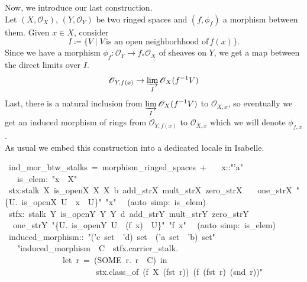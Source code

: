 \documentclass[12pt]{scrartcl}
\begin{document}
Now, we introduce our last construction. \\
	Let $(X, \mathscr{O}_X)$, $(Y, \mathscr{O}_Y)$ be two ringed spaces and $(f, \phi_f)$ a morphism between them. Given $x \in X$, consider 
	\[
	I \coloneqq \lbrace V \mid V \, \text{is an open neighborhhood of}\, f(x) \rbrace .
	\]
	Since we have a morphism $\phi_f: \mathscr{O}_Y \rightarrow f_* \mathscr{O}_X $ of sheaves on $Y$, we get a map between the direct limits over $I$. 
	\[
	\mathscr{O}_{Y, f(x)} \rightarrow \displaystyle \varinjlim_I \mathscr{O}_X (f^{-1} V)
	\]
	Last, there is a natural inclusion from $\displaystyle \varinjlim_I \mathscr{O}_X (f^{-1} V)$ to $\mathscr{O}_{X, x}$, so eventually we get an induced morphism of rings from $\mathscr{O}_{Y, f(x)}$ to $\mathscr{O}_{X, x}$ which we will denote $\phi_{f, x}$. \\	
As usual we embed this construction into a dedicated locale in Isabelle.

\begin{isabelle}
\ ind\_mor\_btw\_stalks\ =\ morphism\_ringed\_spaces\ +\isanewline
\ \ \ x::"'a"\isanewline
\ \ \ is\_elem:\ "x\ \isasymin \ X"\isanewline
{}\isanewline
\isanewline
{}\ stx:stalk\ X\ is\_open\isactrlsub X\ \isasymO \isactrlsub X\ \isasymrho \isactrlsub X\ b\ add\_str\isactrlsub X\ mult\_str\isactrlsub X\ zero\_str\isactrlsub X\ \isanewline
\ \ one\_str\isactrlsub X\ "\{U.\ is\_open\isactrlsub X\ U\ \isasymand \ x\ \isasymin \ U\}"\ "x"\isanewline
{}\ \ (auto\ simp:\ is\_elem)
\isanewline
\isanewline
{}\ stfx:\ stalk\ Y\ is\_open\isactrlsub Y\ \isasymO \isactrlsub Y\ \isasymrho \isactrlsub Y\ d\ add\_str\isactrlsub Y\ mult\_str\isactrlsub Y\ zero\_str\isactrlsub Y\ \isanewline
\ \ one\_str\isactrlsub Y\ "\{U.\ is\_open\isactrlsub Y\ U\ \isasymand \ (f\ x)\ \isasymin \ U\}"\ "f\ x"\isanewline
{}\ \ (auto\ simp:\ is\_elem)
\isanewline
\isanewline
{}\ induced\_morphism::\ "('c\ set\ \isasymtimes \ 'd)\ set\ \isasymRightarrow \ ('a\ set\ \isasymtimes \ 'b)\ set"\ \isanewline
\ \ \ "induced\_morphism\ \isasymequiv \ \isasymlambda C\ \isasymin \ stfx.carrier\_stalk.\ \ \isanewline
\ \ \ \ \ \ \ \ \ \ \ \ \ \ let\ r\ =\ (SOME\ r.\ r\ \isasymin \ C)\ in\ \isanewline
\ \ \ \ \ \ \ \ \ \ \ \ \ \ \ \ \ \ \ \ \ \ stx.class\_of\ (f\isactrlsup \isasyminverse \ X\ (fst\ r))\ (\isasymphi \isactrlsub f\ (fst\ r)\ (snd\ r))"\isanewline
\isanewline
{}
\end{isabelle}
\end{document}

